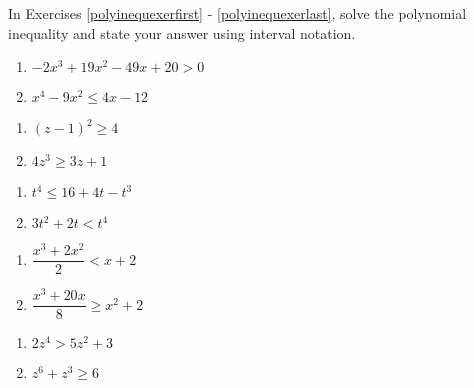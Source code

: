 In Exercises \ref{polyinequexerfirst} - \ref{polyinequexerlast}, solve the polynomial inequality and state your answer using interval notation.



\begin{multicols}{2}
\begin{enumerate}
\setcounter{enumi}{\value{HW}}

\item $-2x^{3} + 19x^{2} - 49x + 20 > 0$ \label{polyinequexerfirst}
\item $x^{4} - 9x^{2} \leq 4x - 12$

\setcounter{HW}{\value{enumi}}
\end{enumerate}
\end{multicols}

\begin{multicols}{2}
\begin{enumerate}
\setcounter{enumi}{\value{HW}}

\item $(z - 1)^{2} \geq 4$
\item $4z^3 \geq 3z+1$

\setcounter{HW}{\value{enumi}}
\end{enumerate}
\end{multicols}

\begin{multicols}{2}
\begin{enumerate}
\setcounter{enumi}{\value{HW}}

\item $t^4 \leq 16+4t-t^3$
\item $3t^2 + 2t < t^4$

\setcounter{HW}{\value{enumi}}
\end{enumerate}
\end{multicols}

\begin{multicols}{2}
\begin{enumerate}
\setcounter{enumi}{\value{HW}}

\item $\dfrac{x^3+2 x^2}{2} < x+2$
\item $\dfrac{x^3+20x}{8} \geq x^2 + 2$

\setcounter{HW}{\value{enumi}}
\end{enumerate}
\end{multicols}

\begin{multicols}{2}
\begin{enumerate}
\setcounter{enumi}{\value{HW}}

\item $2z^4>5z^2+3$
\item $z^6 + z^3 \geq 6$ \label{polyinequexerlast}

\setcounter{HW}{\value{enumi}}
\end{enumerate}
\end{multicols}


